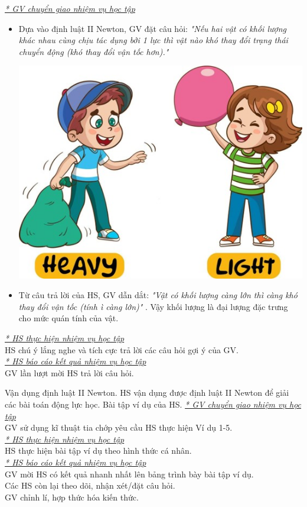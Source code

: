 {\textit{\underline{* GV chuyển giao nhiệm vụ học tập}}
	\begin{itemize}[label=-]
		\item Dựa vào định luật II Newton, GV đặt câu hỏi: \textit{"Nếu hai vật có khối lượng khác nhau cùng chịu tác dụng bởi 1 lực thì vật nào khó thay đổi trạng thái chuyển động (khó thay đổi vận tốc hơn)."}
		\begin{center}
			\includegraphics[scale=0.4]{figs/G10-BAI10-9}
		\end{center}
		\item Từ câu trả lời của HS, GV dẫn dắt: \textit{"Vật có khối lượng càng lớn thì càng khó thay đổi vận tốc (tính ì càng lớn)"
		}. Vậy khối lượng là đại lượng đặc trưng cho mức quán tính của vật.
	\end{itemize}
	\textit{\underline{* HS thực hiện nhiệm vụ học tập}}\\
	HS chú ý lắng nghe và tích cực trả lời các câu hỏi gợi ý của GV.\\
	\textit{\underline{* HS báo cáo kết quả nhiệm vụ học tập}}\\
	GV lần lượt mời HS trả lời câu hỏi.
}
\hoatdong
{Vận dụng định luật II Newton.
}
{HS vận dụng được định luật II Newton để giải các bài toán động lực học.
}
{Bài tập ví dụ của HS.
}
{\textit{\underline{* GV chuyển giao nhiệm vụ học tập}}\\
	GV sử dụng kĩ thuật tia chớp yêu cầu HS thực hiện Ví dụ 1-5.\\
	\textit{\underline{* HS thực hiện nhiệm vụ học tập}}\\
	HS thực hiện bài tập ví dụ theo hình thức cá nhân.\\
	\textit{\underline{* HS báo cáo kết quả nhiệm vụ học tập}}\\
	GV mời HS có kết quả nhanh nhất lên bảng trình bày bài tập ví dụ.\\
	Các HS còn lại theo dõi, nhận xét/đặt câu hỏi.\\
	GV chỉnh lí, hợp thức hóa kiến thức.
}
